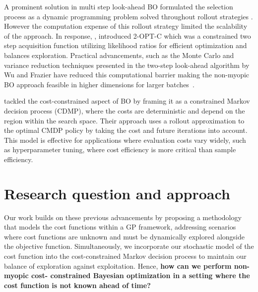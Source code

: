 \documentclass{article}
\begin{document}
A prominent solution in multi step look-ahead BO formulated the 
selection process as a dynamic programming problem solved 
throughout rollout strategies \citep{lamwilcox2017}. However the computation expense of this 
rollout strategy limited the scalability of the approach. In 
response, \citep{zhang2019high}, introduced 2-OPT-C which was a 
constrained two step acquisition function utilizing likelihood 
ratios for efficient optimization and balances exploration. 
Practical advancements, such as the Monte Carlo and variance 
reduction techniques presented in the two-step look-ahead 
algorithm by Wu and Frazier have reduced this 
computational barrier making the non-myopic BO approach 
feasible in higher dimensions for larger batches~\citep{wu2019practical}. 

\citep{lee2021multistep} tackled the cost-constrained aspect of BO 
by framing it as a constrained Markov decision process (CDMP), 
where the costs are deterministic and depend on the region within the 
search space. Their approach uses a rollout approximation to the 
optimal CMDP policy by taking the cost and future iterations into 
account. This model is effective for applications where 
evaluation costs vary widely, such as hyperparameter tuning, 
where cost efficiency is more critical than sample efficiency. 

\section{Research question and approach}
Our work builds on these previous advancements by proposing a 
methodology that models the cost functions within a 
GP framework, addressing scenarios where cost functions are 
unknown and must be dynamically explored alongside the objective 
function. Simultaneously, we incorporate our stochastic model
of the cost function into the cost-constrained Markov decision
process to maintain our balance of exploration against 
exploitation. Hence, \textbf{how can we perform non-myopic cost-
constrained Bayesian optimization in a setting where the cost
function is not known ahead of time?}
\end{document}

